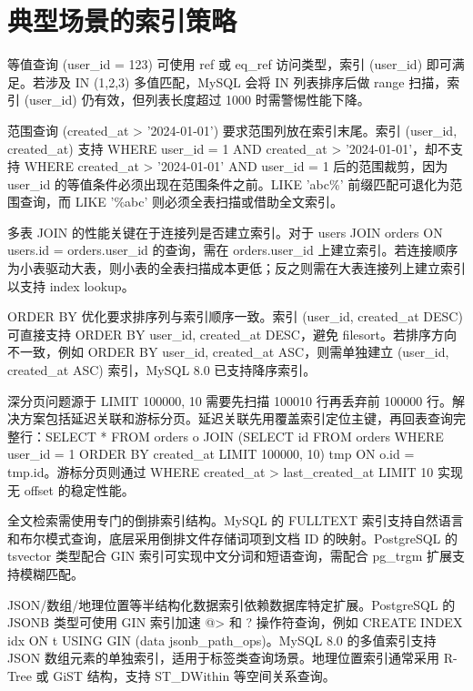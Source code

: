 \chapter{典型场景的索引策略}
等值查询 (user\_{}id = 123) 可使用 ref 或 eq\_{}ref 访问类型，索引 (user\_{}id) 即可满足。若涉及 IN (1,2,3) 多值匹配，MySQL 会将 IN 列表排序后做 range 扫描，索引 (user\_{}id) 仍有效，但列表长度超过 1000 时需警惕性能下降。\par
范围查询 (created\_{}at > '2024-01-01') 要求范围列放在索引末尾。索引 (user\_{}id, created\_{}at) 支持 WHERE user\_{}id = 1 AND created\_{}at > '2024-01-01'，却不支持 WHERE created\_{}at > '2024-01-01' AND user\_{}id = 1 后的范围裁剪，因为 user\_{}id 的等值条件必须出现在范围条件之前。LIKE 'abc\%{}' 前缀匹配可退化为范围查询，而 LIKE '\%{}abc' 则必须全表扫描或借助全文索引。\par
多表 JOIN 的性能关键在于连接列是否建立索引。对于 users JOIN orders ON users.id = orders.user\_{}id 的查询，需在 orders.user\_{}id 上建立索引。若连接顺序为小表驱动大表，则小表的全表扫描成本更低；反之则需在大表连接列上建立索引以支持 index lookup。\par
ORDER BY 优化要求排序列与索引顺序一致。索引 (user\_{}id, created\_{}at DESC) 可直接支持 ORDER BY user\_{}id, created\_{}at DESC，避免 filesort。若排序方向不一致，例如 ORDER BY user\_{}id, created\_{}at ASC，则需单独建立 (user\_{}id, created\_{}at ASC) 索引，MySQL 8.0 已支持降序索引。\par
深分页问题源于 LIMIT 100000, 10 需要先扫描 100010 行再丢弃前 100000 行。解决方案包括延迟关联和游标分页。延迟关联先用覆盖索引定位主键，再回表查询完整行：SELECT * FROM orders o JOIN (SELECT id FROM orders WHERE user\_{}id = 1 ORDER BY created\_{}at LIMIT 100000, 10) tmp ON o.id = tmp.id。游标分页则通过 WHERE created\_{}at > last\_{}created\_{}at LIMIT 10 实现无 offset 的稳定性能。\par
全文检索需使用专门的倒排索引结构。MySQL 的 FULLTEXT 索引支持自然语言和布尔模式查询，底层采用倒排文件存储词项到文档 ID 的映射。PostgreSQL 的 tsvector 类型配合 GIN 索引可实现中文分词和短语查询，需配合 pg\_{}trgm 扩展支持模糊匹配。\par
JSON/数组/地理位置等半结构化数据索引依赖数据库特定扩展。PostgreSQL 的 JSONB 类型可使用 GIN 索引加速 @> 和 ? 操作符查询，例如 CREATE INDEX idx ON t USING GIN (data jsonb\_{}path\_{}ops)。MySQL 8.0 的多值索引支持 JSON 数组元素的单独索引，适用于标签类查询场景。地理位置索引通常采用 R-Tree 或 GiST 结构，支持 ST\_{}DWithin 等空间关系查询。\par
